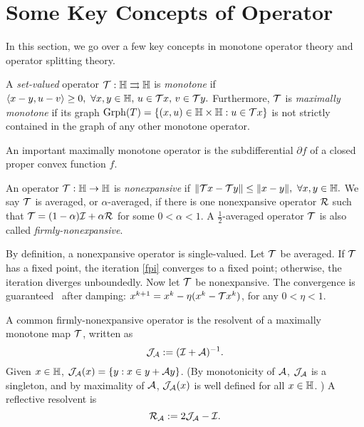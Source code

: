 \section{Some Key Concepts of Operator}\label{sec:op-concept}
In this section, we go over a few key concepts in monotone operator theory and operator splitting theory.

\begin{definition}\label{def:max-mon-op}
A \emph{set-valued} operator ${\mathcal{T}}:\mathbb{H}\rightrightarrows\mathbb{H}$ is \emph{monotone} if
$\langle x-y, u-v\rangle\ge 0,\ \forall x,y\in\mathbb{H},\, u\in {\mathcal{T}} x,\, v\in{\mathcal{T}} y.$
Furthermore, ${\mathcal{T}}$ is \emph{maximally monotone} if its graph $\mathrm{Grph}(T)=\{(x,u)\in \mathbb{H}\times\mathbb{H}: u\in {\mathcal{T}} x\}$ is not strictly contained in the graph of any other monotone operator. 
\end{definition}

\begin{example}\label{exmp:mon-op}
An important maximally monotone operator is the subdifferential $\partial f$ of a closed proper convex function $f$.
\end{example}

\begin{definition}
An operator ${\mathcal{T}}:\mathbb{H}\to\mathbb{H}$ is \emph{nonexpansive} if
$\|{\mathcal{T}} x-{\mathcal{T}} y\|\le\|x-y\|,\ \forall x, y\in\mathbb{H}.$ We say ${\mathcal{T}}$ is averaged, or $\alpha$-averaged, if there is one nonexpansive operator ${\mathcal{R}}$ such that ${\mathcal{T}}=(1-\alpha){\mathcal{I}}+\alpha{\mathcal{R}}$ for some $0<\alpha<1$.  A $\frac{1}{2}$-averaged operator ${\mathcal{T}}$ is also called \emph{firmly-nonexpansive}.
\end{definition}
By definition, a nonexpansive operator is single-valued. Let ${\mathcal{T}}$ be averaged. If ${\mathcal{T}}$ has a fixed point, the iteration \eqref{fpi} converges to a fixed point; otherwise, the iteration diverges unboundedly. Now let  ${\mathcal{T}}$ be nonexpansive. The convergence is guaranteed~\cite{krasnosel1955two} after damping: $x^{k+1} = x^k-\eta(x^k- {\mathcal{T}} x^k)$, for any $0<\eta<1$. 

\begin{example}
A common firmly-nonexpansive operator is the resolvent of a maximally monotone map ${\mathcal{T}}$, written as 
\begin{equation}\label{def-resolvent}\cJ_\cA := (\cI+\cA)^{-1}.
\end{equation} Given $x\in\mathbb{H}$, ${\mathcal{J}}_{\mathcal{A}}(x) =  \{y:x\in y+{\mathcal{A}} y\}$. (By monotonicity of ${\mathcal{A}}$, ${\mathcal{J}}_{\mathcal{A}}$ is a singleton, and by maximality of ${\mathcal{A}}$, ${\mathcal{J}}_{\mathcal{A}}(x)$ is well defined for all $x\in\mathbb{H}$. ) A reflective resolvent is \begin{equation}\label{def-ref}\cR_{\cA}:= 2\cJ_\cA-\cI.
\end{equation}
\end{example}

